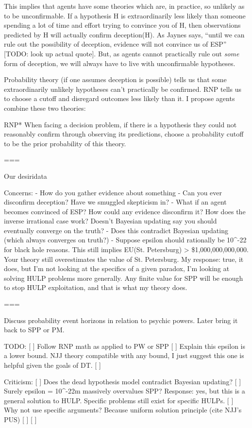 This implies that agents have some theories which are, in practice, so unlikely as to be unconfirmable. If a hypothesis H is extraordinarily less likely than someone spending a lot of time and effort trying to convince you of H, then observations predicted by H will actually confirm deception(H). As Jaynes says, ``until we can rule out the possibility of deception, evidence will not convince us of ESP'' [TODO: look up actual quote]. But, as agents cannot practically rule out \textit{some} form of deception, we will always have to live with unconfirmable hypotheses.

Probability theory (if one assumes deception is possible) tells us that some extraordinarily unlikely hypotheses can't practically be confirmed. RNP tells us to choose a cutoff and disregard outcomes less likely than it. I propose agents combine these two theories:

RNP* When facing a decision problem, if there is a hypothesis they could not reasonably confirm through observing its predictions, choose a probability cutoff \epsilon to be the prior probability of this theory.

=== 

Our desiridata

Concerns:
 - How do you gather evidence about something
 - Can you ever disconfirm deception? Have we smuggled skepticism in?
 - What if an agent becomes convinced of ESP? How could any evidence disconfirm it? How does the inverse irrational case work? Doesn't Bayesian updating say you should eventually converge on the truth?
 - Does this contradict Bayesian updating (which always converges on truth?)
 - Suppose epsilon should rationally be 10^-22 for black hole reasons. This still implies EU(St. Petersburg) > \$1,000,000,000,000. Your theory still overestimates the value of St. Petersburg. My response: true, it does, but I'm not looking at the specifics of a given paradox, I'm looking at solving HULP problems more generally. Any finite value for SPP will be enough to stop HULP exploitation, and that is what my theory does.

===

Discuss probability event horizons in relation to psychic powers. Later bring it back to SPP or PM.

TODO:
[ ] Follow RNP math as applied to PW or SPP
[ ] Explain this epsilon is a lower bound. NJJ theory compatible with any bound, I just suggest this one is helpful given the goals of DT.
[ ] 

Criticism:
[ ] Does the dead hypothesis model contradict Bayesian updating?
[ ] Surely epsilon = 10^-22m massively overvalues SPP? Response: yes, but this is a general solution to HULP. Specific problems still exist for specific HULPs.
[ ] Why not use specific arguments? Because uniform solution principle (cite NJJ's PUS)
[ ] 
[ ]

